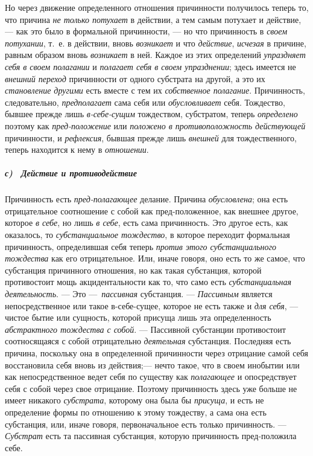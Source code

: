 Но через движение определенного отношения причинности получилось теперь то,
что причина {\em не только потухает} в действии, а тем
самым потухает и действие, — как это было в формальной причинности, — но
что причинность в {\em своем потухании}, т.~е. в
действии, вновь {\em возникает} и что
{\em действие}, {\em исчезая} в
причине, равным образом вновь {\em возникает} в ней.
Каждое из этих определений {\em упраздняет себя в своем
полагании} и {\em полагает себя в своем упразднении};
здесь имеется не {\em внешний переход} причинности от
одного субстрата на другой, а это их {\em становление
другими} есть вместе с тем их {\em собственное
полагание}. Причинность, следовательно,
{\em предполагает} сама себя или
{\em обусловливает} себя. Тождество, бывшее прежде лишь
{\em в-себе-сущим} тождеством, субстратом, теперь
{\em определено} поэтому как
{\em пред-положение} или
{\em положено в противоположность действующей}
причинности, и {\em рефлексия}, бывшая прежде лишь
{\em внешней} для тождественного, теперь находится к
нему в {\em отношении}.

\subparagraph[с) \ Действие и противодействие]{с) \ Действие и
противодействие}
\hypertarget{Toc478978773}{}Причинность есть
{\em пред-полагающее} делание. Причина
{\em обусловлена}; она есть отрицательное соотношение с
собой как пред-положенное, как внешнее другое, которое
{\em в себе}, но лишь {\em в себе},
есть сама причинность. Это другое есть, как оказалось, то
{\em субстанциальное тождество}, в которое переходит
формальная причинность, определившая себя теперь
{\em против этого субстанциального тождества} как его
отрицательное. Или, иначе говоря, оно есть то же самое, что субстанция
причинного отношения, но как такая субстанция, которой противостоит мощь
акцидентальности как то, что само есть
{\em субстанциальная деятельность}. — Это
—~{\em пассивная} субстанция. —
{\em Пассивным} является непосредственное или такое
в-себе-сущее, которое не есть также и {\em для себя}, —
чистое бытие или сущность, которой присуща лишь эта определенность
{\em абстрактного тождества с собой}. — Пассивной
субстанции противостоит соотносящаяся с собой отрицательно
{\em деятельная} субстанция. Последняя есть причина,
поскольку она в определенной причинности через отрицание самой себя
восстановила себя вновь из действия;— нечто такое, что в своем инобытии или
как непосредственное ведет себя по существу как
{\em полагающее} и опосредствует себя с собой через
свое отрицание. Поэтому причинность здесь уже больше не имеет никакого
{\em субстрата}, которому она была бы
{\em присуща}, и есть не определение формы по отношению
к этому тождеству, а сама она есть субстанция, или, иначе говоря,
первоначальное есть только причинность. —
{\em Субстрат} есть та пассивная субстанция, которую
причинность пред-положила себе.

